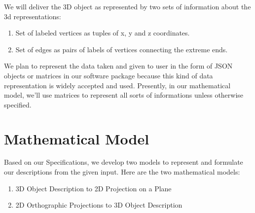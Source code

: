\documentclass[12pt]{report}
\begin{document}
We will deliver the 3D object as represented by two sets of information about the 3d representations:
\begin{enumerate}
\item Set of labeled vertices as tuples of x, y and z coordinates.
\item Set of edges as pairs of labels of vertices connecting the extreme ends.
\end{enumerate}
We plan to represent the data taken and given to user in the form of JSON objects or matrices in our software package because this kind of data representation is widely accepted and used. Presently, in our mathematical model, we'll use matrices to represent all sorts of informations unless otherwise specified.
\newpage
\section*{Mathematical Model}
Based on our Specifications, we develop two models to represent and formulate our descriptions from the given input. Here are the two mathematical models:
\begin{enumerate}
\item 3D Object Description to 2D Projection on a Plane
\item 2D Orthographic Projections to 3D Object Description
\end{enumerate}
\end{document}
